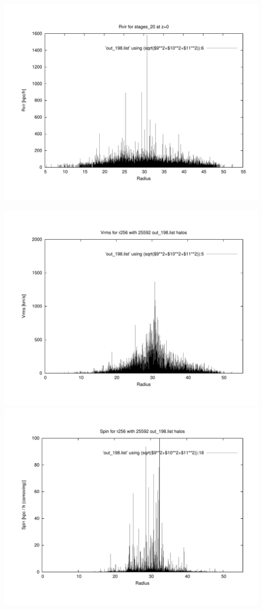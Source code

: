 \includegraphics[scale=0.3]{r256/stages_20/plot_rvir_z0.pdf}

\includegraphics[scale=0.3]{r256/stages_20/plot_Vrms_out_198.pdf}
\includegraphics[scale=0.3]{r256/stages_20/plot_spin_out_198.pdf}

